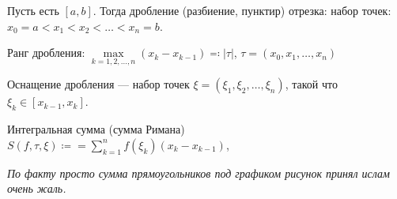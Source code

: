 \begin{definition}
    Пусть есть $[a, b]$. Тогда дробление (разбиение, пунктир) отрезка: набор точек:  $x_0 = a < x_1 < x_2 < \ldots < x_n = b$.
\end{definition}
\begin{definition}
    Ранг дробления: $\max\limits_{k=1,2,\ldots, n}(x_k - x_{k-1}) \eqqcolon |\tau|$, $\tau = (x_0, x_1, \ldots, x_n)$
\end{definition}

\begin{definition}
    Оснащение дробления --- набор точек $\xi = ( \xi_1, \xi_2, \ldots, \xi_n)$, такой что $\xi_k \in [x_{k-1}, x_k]$.
\end{definition}
\begin{definition}
    Интегральная сумма (сумма Римана) $S(f, \tau, \xi) \coloneqq = \sum\limits_{k=1}^n f(\xi_k)(x_k - x_{k-1})$, 

    \textit{По факту просто сумма прямоугольников под графиком рисунок принял ислам очень жаль.}
\end{definition}
